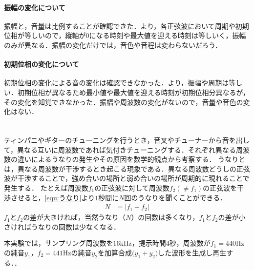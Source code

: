 \paragraph{振幅の変化について} 振幅と，音量は比例することが確認できた．より，各正弦波において周期や初期位相が等しいので，縦軸が\(0\)になる時刻や最大値を迎える時刻は等しいく，振幅のみが異なる．振幅の変化だけでは，音色や音程は変わらないだろう．
\paragraph{初期位相の変化について} 初期位相の変化による音の変化は確認できなかった．より，振幅や周期は等しい．初期位相が異なるため最小値や最大値を迎える時刻が初期位相分異なるが，その変化を知覚できなかった．振幅や周波数の変化がないので，音量や音色の変化はない．
\section{\kadaiac}\label{sec:\kadaiac}
\purpose
ティンパニやギターのチューニングを行うとき，音叉やチューナーから音を出して，異なる互いに周波数であれば気付きチューニングする．それぞれ異なる周波数の違いによるうなりの発生やその原因を数学的観点から考察する．
\method
うなりとは，異なる周波数が干渉するとき起こる現象である．異なる周波数どうしの正弦波が干渉することで，強め合いの場所と弱め合いの場所が周期的に現れることで発生する．
たとえば周波数\(f_1\)の正弦波に対して周波数\(f_2(\neq f_1)\)の正弦波を干渉させると，\eqref{equ:うなり}より\(1\)秒間に\(N\)回のうなりを聞くことができる．
\begin{align}
    N & = \big|f_1-f_2\big|\label{equ:うなり}
\end{align}
\(f_1\)と\(f_2\)の差が大きければ，当然うなり（\(N\)）の回数は多くなり，\(f_1\)と\(f_2\)の差が小さければうなりの回数は少なくなる．\par
本実験では，サンプリング周波数を\(16\textrm{kHz}\)，提示時間\(4\)秒，周波数が\(f_1=440\textrm{Hz}\)の純音\(y_1\)，\(f_2=441\textrm{Hz}\)の純音\(y_2\)を加算合成\(\big(y_1+y_2\big)\)した波形を生成し再生する．\scall{}．


